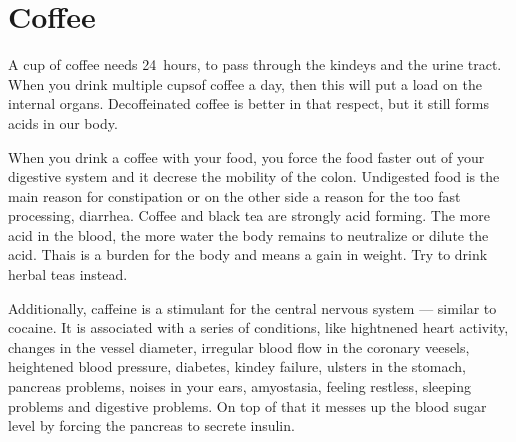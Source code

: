 \documentclass[../main.tex]{subfiles}
\begin{document}
\label{SpecialFoods} %

\section{Coffee}

A cup of coffee needs \SI{24}{hours}, to pass through the kindeys and the urine tract.
When you drink multiple cupsof coffee a day, then this will put a load on the internal organs.
Decoffeinated coffee is better in that respect, but it still forms acids in our body.

When you drink a coffee with your food, you force the food faster out of your digestive system
and it decrese the mobility of the colon. Undigested food is the main reason for constipation or on the other side a reason for the too fast processing, diarrhea.
Coffee and black tea are strongly acid forming.
The more acid in the blood, the more water the body remains to neutralize or dilute the acid.
Thais is a burden for the body and means a gain in weight.
Try to drink herbal teas instead.

Additionally, caffeine is a stimulant for the central nervous system --- similar to cocaine.
It is associated with a series of conditions, like hightnened heart activity,
changes in the vessel diameter,
irregular blood flow in the coronary veesels,
heightened blood pressure,
diabetes,
kindey failure,
ulsters in the stomach,
pancreas problems,
noises in your ears,
amyostasia,
feeling restless,
sleeping problems and
digestive problems.
On top of that it messes up the blood sugar level by forcing the pancreas to secrete insulin.
\end{document}
